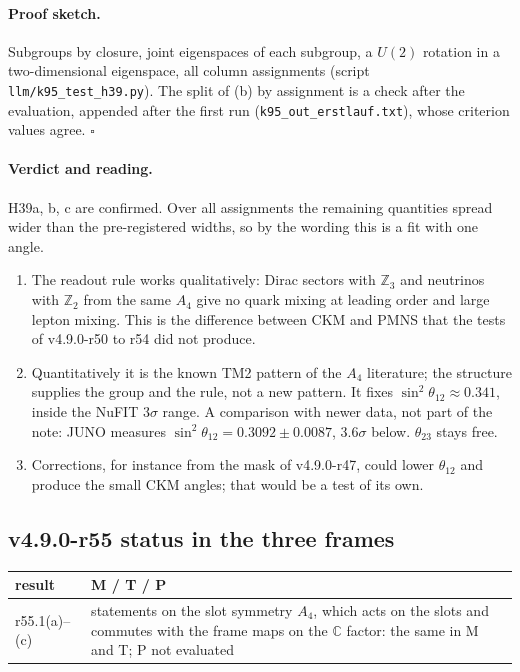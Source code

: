 \paragraph{Proof sketch.}
Subgroups by closure, joint eigenspaces of each subgroup, a \(U(2)\) rotation in a two-dimensional eigenspace, all column assignments (script
\texttt{llm/k95\_test\_h39.py}).  The split of (b) by assignment is a check after the evaluation, appended after the first run
(\texttt{k95\_out\_erstlauf.txt}), whose criterion values agree.  \(\square\)

\paragraph{Verdict and reading.}
H39a, b, c are confirmed.  Over all assignments the remaining quantities spread wider than the pre-registered widths, so by the wording this is a
fit with one angle.
\begin{enumerate}[leftmargin=2em]
\item The readout rule works qualitatively: Dirac sectors with \(\mathbb Z_3\) and neutrinos with \(\mathbb Z_2\) from the same \(A_4\) give no quark mixing
at leading order and large lepton mixing.  This is the difference between CKM and PMNS that the tests of v4.9.0-r50 to r54 did not produce.
\item Quantitatively it is the known TM2 pattern of the \(A_4\) literature; the structure supplies the group and the rule, not a new pattern.  It fixes
\(\sin^2\theta_{12}\approx0.341\), inside the NuFIT \(3\sigma\) range.  A comparison with newer data, not part of the note: JUNO measures
\(\sin^2\theta_{12}=0.3092\pm0.0087\), \(3.6\sigma\) below.  \(\theta_{23}\) stays free.
\item Corrections, for instance from the mask of v4.9.0-r47, could lower \(\theta_{12}\) and produce the small CKM angles; that would be a test of its own.
\end{enumerate}

\subsection*{v4.9.0-r55 status in the three frames}
\label{subsec:v490-r55-frames}

\begin{center}
\small
\begin{tabular}{@{}>{\raggedright\arraybackslash}p{}>{\raggedright\arraybackslash}p{}@{}}
\toprule
result & M / T / P\\
\midrule
r55.1(a)--(c) & statements on the slot symmetry \(A_4\), which acts on the slots and commutes with the frame maps on the \(\mathbb C\) factor: the same in M and T; P not evaluated\\
\bottomrule
\end{tabular}
\end{center}

